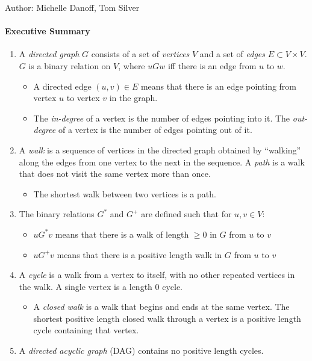 \documentclass[solution, letterpaper]{cs20inclass}
\begin{document}

\noindent Author: Michelle Danoff, Tom Silver%

\paragraph*{Executive Summary}
\begin{enumerate}
\item A \textit{directed graph} $G$ consists of a set of \textit{vertices} $V$ and a set of \textit{edges} $E \subset V \times V$. $G$ is a binary relation on $V$, where $uGw$ iff there is an edge from $u$ to $w$.
\begin{itemize}
\item A directed edge $(u,v) \in E$ means that there is an edge pointing from vertex $u$ to vertex $v$ in the graph.
\item The \textit{in-degree} of a vertex is the number of edges pointing into it. The \textit{out-degree} of a vertex is the number of edges pointing out of it.
\end{itemize}
\item A \textit{walk} is a sequence of vertices in the directed graph obtained by ``walking'' along the edges from one vertex to the next in the sequence. A \textit{path} is a walk that does not visit the same vertex more than once.
\begin{itemize}
\item The shortest walk between two vertices is a path. 
\end{itemize}
\item The binary relations $G^*$ and $G^+$ are defined such that for $u, v \in V$:
\begin{itemize}
\item $u G^* v$ means that there is a walk of length $\ge 0$ in $G$ from $u$ to $v$
\item $u G^+ v$ means that there is a positive length walk in $G$ from $u$ to $v$
\end{itemize}
\item A \textit{cycle} is a walk from a vertex to itself, with no other repeated vertices in the walk. A single vertex is a length 0 cycle.
\begin{itemize}
\item A \textit{closed walk} is a walk that begins and ends at the same vertex. The shortest positive length closed walk through a vertex is a positive length cycle containing that vertex.
\end{itemize}
\item A \textit{directed acyclic graph} (DAG) contains no positive length cycles.

\end{enumerate}
\end{document}
